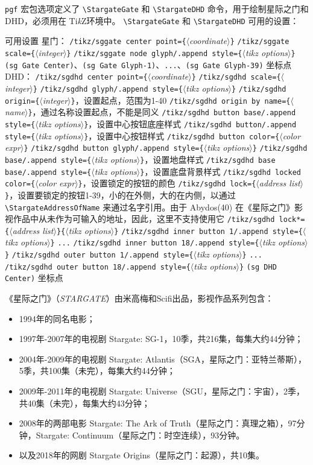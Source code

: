 \documentclass[12pt]{article}
\providecommand{\tikzlogo}{Ti\emph{k}Z}
\providecommand{\cs}[1]{\texttt{\textbackslash#1}}
\providecommand{\meta}[1]{$\langle$\textit{#1}$\rangle$}
\providecommand{\opt}{\texttt}
\providecommand{\marg}[1]{\texttt\{\meta{#1}\texttt\}}
\begin{document}
\opt{pgf} 宏包选项定义了 \cs{StargateGate} 和 \cs{StargateDHD} 命令，用于绘制星际之门和DHD，必须用在 \tikzlogo 环境中。
\cs{StargateGate} 和 \cs{StargateDHD} 可用的设置：
\begin{setting}{可用设置}
{\obeylines
星门：
\verb|/tikz/sggate center point=|\marg{coordinate}
\verb|/tikz/sggate scale=|\marg{integer}
\verb|/tikz/sggate node glyph/.append style=|\marg{tikz options}
\verb|(sg Gate Center)|、\verb|(sg Gate Glyph-1)|、\verb|...|、\verb|(sg Gate Glyph-39)| 坐标点
DHD：
\verb|/tikz/sgdhd center point=|\marg{coordinate}
\verb|/tikz/sgdhd scale=|\marg{integer}
\verb|/tikz/sgdhd glyph/.append style=|\marg{tikz options}
\verb|/tikz/sgdhd origin=|\marg{integer}，设置起点，范围为1-40
\verb|/tikz/sgdhd origin by name=|\marg{name}，通过名称设置起点，不能是同义
\verb|/tikz/sgdhd button base/.append style=|\marg{tikz options}，设置中心按钮底座样式
\verb|/tikz/sgdhd button/.append style=|\marg{tikz options}，设置中心按钮样式
\verb|/tikz/sgdhd button color=|\marg{color expr}
\verb|/tikz/sgdhd button glyph/.append style=|\marg{tikz options}
\verb|/tikz/sgdhd base/.append style=|\marg{tikz options}，设置地盘样式
\verb|/tikz/sgdhd base base/.append style=|\marg{tikz options}，设置底盘背景样式
\verb|/tikz/sgdhd locked color=|\marg{color expr}，设置锁定的按钮的颜色
\verb|/tikz/sgdhd lock=|\marg{address list}，设置要锁定的按钮1-39，小的在外侧，大的在内侧，以通过 \cs{StargateAddressOfName} 来通过名字引用。由于 Abydos(40) 在《星际之门》影视作品中从未作为可输入的地址，因此，这里不支持使用它
\verb|/tikz/sgdhd lock*=|\marg{address list}\marg{tikz options}
\verb|/tikz/sgdhd inner button 1/.append style=|\marg{tikz options}
\verb|...|
\verb|/tikz/sgdhd inner button 18/.append style=|\marg{tikz options}
\verb|/tikz/sgdhd outer button 1/.append style=|\marg{tikz options}
\verb|...|
\verb|/tikz/sgdhd outer button 18/.append style=|\marg{tikz options}
\verb|(sg DHD Center)| 坐标点
}
\end{setting}

《星际之门》（\textit{STARGATE}）由米高梅和Scifi出品，影视作品系列包含：
\begin{itemize}
  \item 1994年的同名电影；
  \item 1997年-2007年的电视剧 Stargate: SG-1，10季，共216集，每集大约44分钟；
  \item 2004年-2009年的电视剧 Stargate: Atlantis（SGA，星际之门：亚特兰蒂斯），5季，共100集（未完），每集大约44分钟；
  \item 2009年-2011年的电视剧 Stargate: Universe（SGU，星际之门：宇宙），2季，共40集（未完），每集大约43分钟；
  \item 2008年的两部电影 Stargate: The Ark of Truth（星际之门：真理之箱），97分钟，Stargate: Continuum（星际之门：时空连续），93分钟。
  \item 以及2018年的网剧 Stargate Origins（星际之门：起源），共10集。
\end{itemize}
\end{document}
